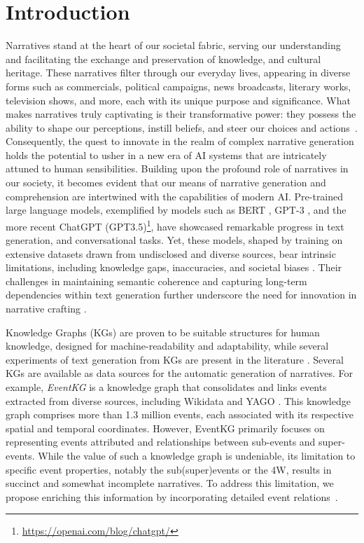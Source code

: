 \documentclass[
hf, %
]{ceurart}
\begin{document}
\section{Introduction}
\label{sec:introduction}
Narratives stand at the heart of our societal fabric, serving our understanding and facilitating the exchange and preservation of knowledge, and cultural heritage. These narratives filter through our everyday lives, appearing in diverse forms such as commercials, political campaigns, news broadcasts, literary works, television shows, and more, each with its unique purpose and significance. 
What makes narratives truly captivating is their transformative power: they possess the ability to shape our perceptions, instill beliefs, and steer our choices and actions~\cite{green2004understanding}. Consequently, the quest to innovate in the realm of complex narrative generation holds the potential to usher in a new era of AI systems that are intricately attuned to human sensibilities. Building upon the profound role of narratives in our society, it becomes evident that our means of narrative generation and comprehension are intertwined with the capabilities of modern AI. Pre-trained large language models, exemplified by models such as BERT \cite{BERT}, GPT-3 \cite{GPT-3}, and the more recent ChatGPT (GPT3.5)\footnote{\url{https://openai.com/blog/chatgpt/}}, have showcased remarkable progress in text generation, and conversational tasks. Yet, these models, shaped by training on extensive datasets drawn from undisclosed and diverse sources, bear intrinsic limitations, including knowledge gaps, inaccuracies, and societal biases \cite{GPT-3,documenting_corpora}. Their challenges in maintaining semantic coherence and capturing long-term dependencies within text generation further underscore the need for innovation in narrative crafting \cite{PLM_survey,semantic_coherence}. 

Knowledge Graphs (KGs) are proven to be suitable structures for human knowledge, designed for machine-readability and adaptability, while several experiments of text generation from KGs are present in the literature \cite{KG_survey}. Several KGs are available as data sources for the automatic generation of narratives. For example, \textit{EventKG} \cite{gottschalk2019eventkg} is a knowledge graph that consolidates and links events extracted from diverse sources, including Wikidata and YAGO \cite{hoffart2013yago2}. This knowledge graph comprises more than 1.3 million events, each associated with its respective spatial and temporal coordinates. However, EventKG primarily focuses on representing events attributed and relationships between sub-events and super-events. While the value of such a knowledge graph is undeniable, its limitation to specific event properties, notably the sub(super)events or the 4W, results in succinct and somewhat incomplete narratives. To address this limitation, we propose enriching this information by incorporating detailed event relations~\cite{beyond_causality}.
\end{document}
